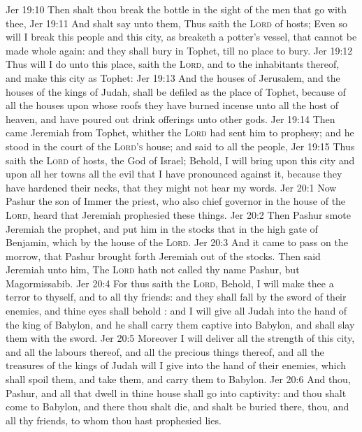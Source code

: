 \vs Jer 19:10 Then shalt thou break the bottle in the sight of the men that go with thee,
\vs Jer 19:11 And shalt say unto them, Thus saith the \textsc{Lord} of hosts; Even so will I break this people and this city, as  breaketh a potter's vessel, that cannot be made whole again: and they shall bury  in Tophet, till  no place to bury.
\vs Jer 19:12 Thus will I do unto this place, saith the \textsc{Lord}, and to the inhabitants thereof, and  make this city as Tophet:
\vs Jer 19:13 And the houses of Jerusalem, and the houses of the kings of Judah, shall be defiled as the place of Tophet, because of all the houses upon whose roofs they have burned incense unto all the host of heaven, and have poured out drink offerings unto other gods.
\vs Jer 19:14 Then came Jeremiah from Tophet, whither the \textsc{Lord} had sent him to prophesy; and he stood in the court of the \textsc{Lord's} house; and said to all the people,
\vs Jer 19:15 Thus saith the \textsc{Lord} of hosts, the God of Israel; Behold, I will bring upon this city and upon all her towns all the evil that I have pronounced against it, because they have hardened their necks, that they might not hear my words.
\vs Jer 20:1 Now Pashur the son of Immer the priest, who  also chief governor in the house of the \textsc{Lord}, heard that Jeremiah prophesied these things.
\vs Jer 20:2 Then Pashur smote Jeremiah the prophet, and put him in the stocks that  in the high gate of Benjamin, which  by the house of the \textsc{Lord}.
\vs Jer 20:3 And it came to pass on the morrow, that Pashur brought forth Jeremiah out of the stocks. Then said Jeremiah unto him, The \textsc{Lord} hath not called thy name Pashur, but Magormissabib.
\vs Jer 20:4 For thus saith the \textsc{Lord}, Behold, I will make thee a terror to thyself, and to all thy friends: and they shall fall by the sword of their enemies, and thine eyes shall behold : and I will give all Judah into the hand of the king of Babylon, and he shall carry them captive into Babylon, and shall slay them with the sword.
\vs Jer 20:5 Moreover I will deliver all the strength of this city, and all the labours thereof, and all the precious things thereof, and all the treasures of the kings of Judah will I give into the hand of their enemies, which shall spoil them, and take them, and carry them to Babylon.
\vs Jer 20:6 And thou, Pashur, and all that dwell in thine house shall go into captivity: and thou shalt come to Babylon, and there thou shalt die, and shalt be buried there, thou, and all thy friends, to whom thou hast prophesied lies.
